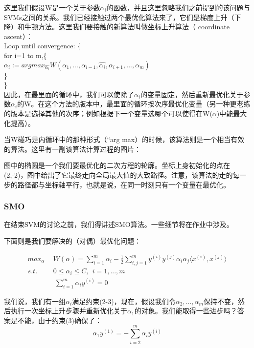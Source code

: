 \documentclass[UTF8]{ctexart}
\begin{document}
这里我们假设W是一个关于参数$\alpha_{i}$的函数，并且这里忽略我们之前提到的该问题与SVMs之间的关系。我们已经接触过两个最优化算法来了，它们是梯度上升（下降）和牛顿方法。这里我们要接触的新算法叫做坐标上升算法（ coordinate ascent）：\\

Loop until convergence: \{\\
 for i=1 to m,\{\\
 	$  \alpha_{i}:= arg max_{\hat{\alpha_{i}}} W(\alpha_{1},...,\alpha_{i-1},\hat{\alpha_{i}},\alpha_{i+1},...,\alpha_{m}) $\\
	\}\\
 \}\\

因此，在最里面的循环中，我们可以使除了$\alpha_{i}$的变量固定，然后重新最优化关于参数$\alpha_{i}$的W。在这个方法的版本中，最里面的循环按次序最优化变量（另一种更老练的版本是选择其他的次序；例如根据下一个变量选哪个可以使得在W($\alpha$)中能最大化提高）。

当W碰巧是内循环中的那种形式（“arg max）的时候，该算法则是一个相当有效的算法。这里有一副该算法计算过程的图片：


\begin{figure}[htb]        
\end{figure}

图中的椭圆是一个我们要最优化的二次方程的轮廓。坐标上身初始化的点在(2,-2)，图中给出了它最终走向全局最大值的大致路径。注意，该算法的走的每一步的路径都与坐标轴平行，也就是说，在同一时刻只有一个变量在最优化。


\subsubsection{SMO}

在结束SVM的讨论之前，我们得讲述SMO算法。一些细节将在作业中涉及。

下面则是我们要解决的（对偶）最优化问题：

\begin{align}
max_{\alpha} & \ \ W(\alpha) = \sum_{i=1}^{m} \alpha_{i} - \frac{1}{2} \sum_{i,j=1}^{m}y^{(i)}y^{(j)}\alpha_{i}\alpha_{j}\langle x^{(i)},x^{(j)}\rangle \\
s.t. & \ \ 0 \leq \alpha_{i}\leq C,\ \ i=1,...,m \\
\ & \ \ \ \sum_{i=1}^{m}\alpha_{i}y^{(i)} = 0
\end{align}



我们说，我们有一组$\alpha_{i}$满足约束(2-3)，现在，假设我们令$\alpha_{2},...,\alpha_{m}$保持不变，然后执行一次坐标上升步骤并重新优化关于$\alpha_{1}$的对象。我们能取得一些进步吗？答案是不能，由于约束(3)确保了：\[ \alpha_{1}y^{(1)} = - \sum_{i=2}^{m}\alpha_{i}y^{(i)} \]
\end{document}

